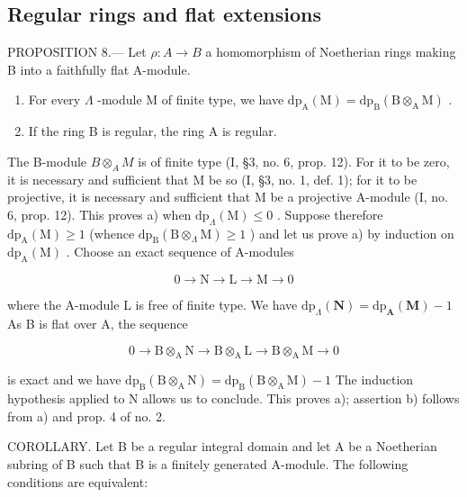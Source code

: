 \subsection{Regular rings and flat extensions}

PROPOSITION 8.--- Let \(\rho: A \to B\) a homomorphism of Noetherian rings making B into a faithfully flat A-module.

\begin{enumerate}
\def\labelenumi{\alph{enumi})}
\item
  For every \(\Lambda\) -module M of finite type, we have \(\mathrm{dp}_{\mathrm{A}}(\mathrm{M}) = \mathrm{dp}_{\mathrm{B}}(\mathrm{B} \otimes_{\mathrm{A}} \mathrm{M})\) .
\item
  If the ring B is regular, the ring A is regular.
\end{enumerate}

The B-module \(B \otimes_{A} M\) is of finite type (I, §3, no. 6, prop. 12). For it to be zero, it is necessary and sufficient that M be so (I, §3, no. 1, def. 1); for it to be projective, it is necessary and sufficient that M be a projective A-module (I, no. 6, prop. 12). This proves a) when \(\mathrm{dp}_{\Lambda}(\mathrm{M}) \leqslant 0\) . Suppose therefore \(\mathrm{dp}_{\mathrm{A}}(\mathrm{M}) \geqslant 1\) (whence \(\mathrm{dp}_{\mathrm{B}}(\mathrm{B} \otimes_{\Lambda} \mathrm{M}) \geqslant 1\) ) and let us prove a) by induction on \(\mathrm{dp}_{\mathrm{A}}(\mathrm{M})\) . Choose an exact sequence of A-modules

\[
0 \to \mathrm{N} \to \mathrm{L} \to \mathrm{M} \to 0
\]

where the A-module L is free of finite type. We have \(\mathrm{dp}_{\Lambda}(\mathbf{N}) = \mathrm{dp}_{\mathbf{A}}(\mathbf{M}) - 1\) As B is flat over A, the sequence

\[
0 \rightarrow \mathrm{B} \otimes_ {\mathrm{A}} \mathrm{N} \rightarrow \mathrm{B} \otimes_ {\mathrm{A}} \mathrm{L} \rightarrow \mathrm{B} \otimes_ {\mathrm{A}} \mathrm{M} \rightarrow 0
\]

is exact and we have \(\mathrm{dp}_{\mathrm{B}}(\mathrm{B}\otimes_{\mathrm{A}}\mathrm{N}) = \mathrm{dp}_{\mathrm{B}}(\mathrm{B}\otimes_{\mathrm{A}}\mathrm{M}) - 1\) The induction hypothesis applied to N allows us to conclude. This proves a); assertion b) follows from a) and prop. 4 of no. 2.

COROLLARY. Let B be a regular integral domain and let A be a Noetherian subring of B such that B is a finitely generated A-module. The following conditions are equivalent:

